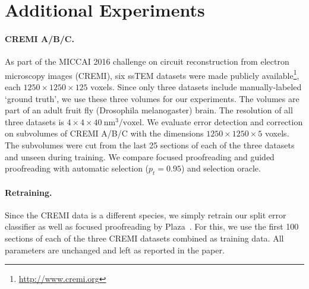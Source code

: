 \section{Additional Experiments}
\label{sec:addexp}

\paragraph{CREMI A/B/C.} As part of the MICCAI 2016 challenge on circuit reconstruction from electron microscopy images (CREMI), six ssTEM datasets were made publicly available\footnote{\scriptsize{\url{http://www.cremi.org}}},  each $1250\times1250\times125$ voxels. Since only three datasets include manually-labeled `ground truth', we use these three volumes for our experiments. The volumes are part of an adult fruit fly (Drosophila melanogaster) brain. The resolution of all three datasets is $4\times4\times40~\text{nm}^3\text{/voxel}$. We evaluate error detection and correction on subvolumes of CREMI A/B/C with the dimensions $1250\times1250\times5$ voxels. The subvolumes were cut from the last 25 sections of each of the three datasets and unseen during training. We compare focused proofreading and guided proofreading with automatic selection ($p_t=0.95$) and selection oracle.

\paragraph{Retraining.} Since the CREMI data is a different species, we simply retrain our split error classifier as well as focused proofreading by Plaza~\cite{focused_proofreading}. For this, we use the first 100 sections of each of the three CREMI datasets combined as training data. All parameters are unchanged and left as reported in the paper. 


